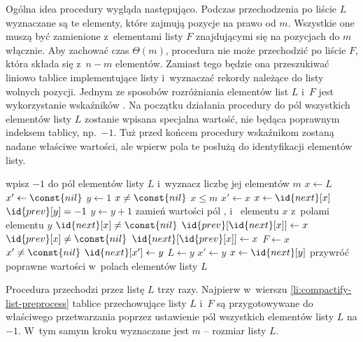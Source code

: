 \exercise %
Ogólna idea procedury  wygląda następująco.
Podczas przechodzenia po liście $L$ wyznaczane są te elementy, które zajmują pozycje na prawo od $m$.
Wszystkie one muszą być zamienione z~elementami listy $F$ znajdującymi się na pozycjach do $m$ włącznie.
Aby zachować czas $\Theta(m)$, procedura nie może przechodzić po liście $F$, która składa się z~$n-m$ elementów.
Zamiast tego będzie ona przeszukiwać liniowo tablice implementujące listy i~wyznaczać rekordy należące do listy wolnych pozycji.
Jednym ze sposobów rozróżniania elementów list $L$ i~$F$ jest wykorzystanie wskaźników .
Na początku działania procedury do pól  wszystkich elementów listy $L$ zostanie wpisana specjalna wartość, nie będąca poprawnym indeksem tablicy, np.\ $-1$.
Tuż przed końcem procedury wskaźnikom  zostaną nadane właściwe wartości, ale wpierw pola te posłużą do identyfikacji elementów listy.
\begin{codebox}
\li	wpisz $-1$ do pól  elementów listy $L$ i~wyznacz liczbę jej elementów $m$ \label{li:compactify-list-preprocess}
\li $x\gets L$
\li	$x'\gets\const{nil}$
\li	$y\gets1$
\li	\While $x\ne\const{nil}$ \label{li:compactify-list-while-begin}
\li		\Do \If $x\le m$
\li				\Then $x'\gets x$
\li					$x\gets\id{next}[x]$
\li				\Else \While $\id{prev}[y]=-1$ \label{li:compactify-list-while2-begin}
\li						\Do $y\gets y+1$
						\End \label{li:compactify-list-while2-end}
\li					zamień wartości pól ,  i~ elementu $x$ z~polami elementu $y$ \label{li:compactify-list-swap}
\li					\If $\id{next}[x]\ne\const{nil}$
\li						\Then $\id{prev}[\id{next}[x]]\gets x$ \label{li:compactify-list-update-prev-next}
						\End
\li					\If $\id{prev}[x]\ne\const{nil}$
\li						\Then $\id{next}[\id{prev}[x]]\gets x$ \label{li:compactify-list-update-next-prev}
\li						\Else $F\gets x$ \label{li:compactify-free-list-head-update}
						\End
\li					\If $x'\ne\const{nil}$
\li						\Then $\id{next}[x']\gets y$ \label{li:compactify-list-update-predecessor-next}
\li						\Else $L\gets y$ \label{li:compactify-list-head-update}
						\End
\li					$x'\gets y$
\li					$x\gets\id{next}[y]$
				\End
		\End \label{li:compactify-list-while-end}
\li	przywróć poprawne wartości w~polach  elementów listy $L$ \label{li:compactify-list-postprocess}
\end{codebox}

Procedura przechodzi przez listę $L$ trzy razy.
Najpierw w~wierszu \ref{li:compactify-list-preprocess} tablice przechowujące listy $L$ i~$F$ są przygotowywane do właściwego przetwarzania poprzez ustawienie pól  wszystkich elementów listy $L$ na $-1$.
W~tym samym kroku wyznaczane jest $m$ -- rozmiar listy $L$.

